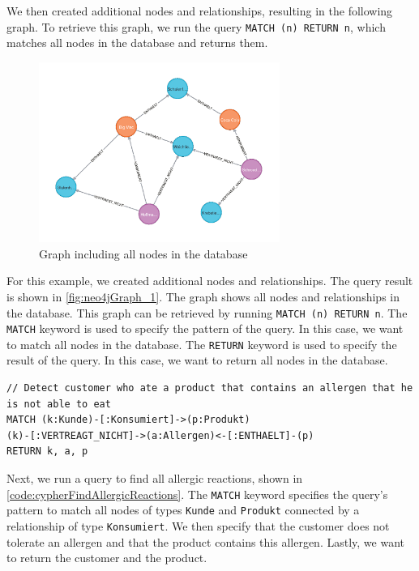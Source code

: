 We then created additional nodes and relationships, resulting in the following graph. To retrieve this graph, we run the query \texttt{MATCH (n) RETURN n}, which matches all nodes in the database and returns them.

\begin{figure}[H]
    \centering
    \caption{Graph including all nodes in the database} \label{fig:neo4jGraph_1}
    \includegraphics[width=0.7\textwidth]{images/neo4j_example_graph_1.png}
\end{figure}

For this example, we created additional nodes and relationships. The query result is shown in \autoref{fig:neo4jGraph_1}. The graph shows all nodes and relationships in the database. This graph can be retrieved by running \texttt{MATCH (n) RETURN n}. The \texttt{MATCH} keyword is used to specify the pattern of the query. In this case, we want to match all nodes in the database. The \texttt{RETURN} keyword is used to specify the result of the query. In this case, we want to return all nodes in the database.

\begin{code}[H]
    \caption{Cypher Query to select allergic reactions} \label{code:cypherFindAllergicReactions}
    \begin{verbatim}
// Detect customer who ate a product that contains an allergen that he is not able to eat
MATCH (k:Kunde)-[:Konsumiert]->(p:Produkt)
(k)-[:VERTREAGT_NICHT]->(a:Allergen)<-[:ENTHAELT]-(p)
RETURN k, a, p
    \end{verbatim}
\end{code}

Next, we run a query to find all allergic reactions, shown in \autoref{code:cypherFindAllergicReactions}. The \texttt{MATCH} keyword specifies the query's pattern to match all nodes of types \texttt{Kunde} and \texttt{Produkt} connected by a relationship of type \texttt{Konsumiert}. We then specify that the customer does not tolerate an allergen and that the product contains this allergen. Lastly, we want to return the customer and the product.

